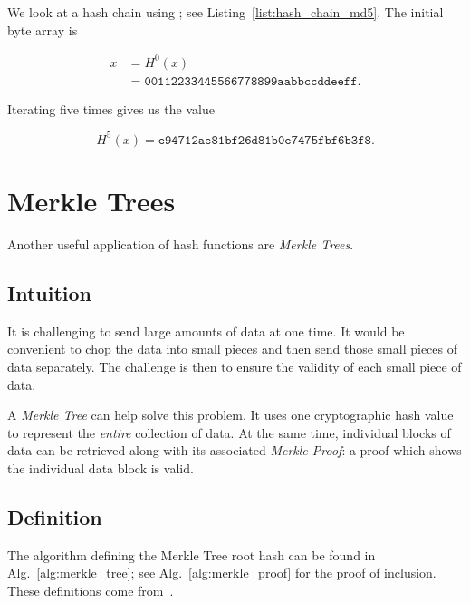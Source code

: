 \begin{example}

We look at a hash chain using \MDFive{};
see Listing~\ref{list:hash_chain_md5}.
The initial byte array is

\begin{align}
    x &= H^{0}(x) \nonumber\\
        &= \texttt{00112233445566778899aabbccddeeff}.
\end{align}



\noindent
Iterating \MDFive{} five times gives us the value

\begin{equation}
    H^{5}(x) = \texttt{e94712ae81bf26d81b0e7475fbf6b3f8}.
\end{equation}
\end{example}



\section{Merkle Trees}

Another useful application of \glspl{hash function} are \emph{Merkle Trees}.

\subsection{Intuition}

It is challenging to send large amounts of data at one time.
It would be convenient to chop the data into small pieces
and then send those small pieces of data separately.
The challenge is then to ensure the validity of each small
piece of data.

A \emph{Merkle Tree} can help solve this problem.
It uses one cryptographic hash value to represent the \emph{entire}
collection of data.
At the same time, individual blocks of data can be retrieved
along with its associated \emph{Merkle Proof}:
a proof which shows the individual data block is valid.

\subsection{Definition}

The algorithm defining the Merkle Tree root hash can be found in
Alg.~\ref{alg:merkle_tree};
see Alg.~\ref{alg:merkle_proof} for the proof of inclusion.
These definitions come from~\cite[Chapter 8.9]{BonehShoupGraduateApplied}.

